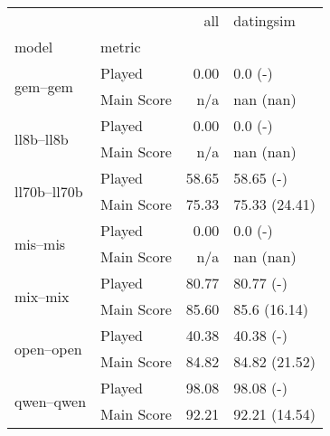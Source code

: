 \begin{tabular}{llrl}
\toprule
 &  & all & datingsim \\
model & metric &  &  \\
\midrule
\multirow[t]{2}{*}{gem--gem} & Played & 0.00 & 0.0 (-) \\
 & Main Score & n/a & nan (nan) \\
\cline{1-4}
\multirow[t]{2}{*}{ll8b--ll8b} & Played & 0.00 & 0.0 (-) \\
 & Main Score & n/a & nan (nan) \\
\cline{1-4}
\multirow[t]{2}{*}{ll70b--ll70b} & Played & 58.65 & 58.65 (-) \\
 & Main Score & 75.33 & 75.33 (24.41) \\
\cline{1-4}
\multirow[t]{2}{*}{mis--mis} & Played & 0.00 & 0.0 (-) \\
 & Main Score & n/a & nan (nan) \\
\cline{1-4}
\multirow[t]{2}{*}{mix--mix} & Played & 80.77 & 80.77 (-) \\
 & Main Score & 85.60 & 85.6 (16.14) \\
\cline{1-4}
\multirow[t]{2}{*}{open--open} & Played & 40.38 & 40.38 (-) \\
 & Main Score & 84.82 & 84.82 (21.52) \\
\cline{1-4}
\multirow[t]{2}{*}{qwen--qwen} & Played & 98.08 & 98.08 (-) \\
 & Main Score & 92.21 & 92.21 (14.54) \\
\cline{1-4}
\bottomrule
\end{tabular}
